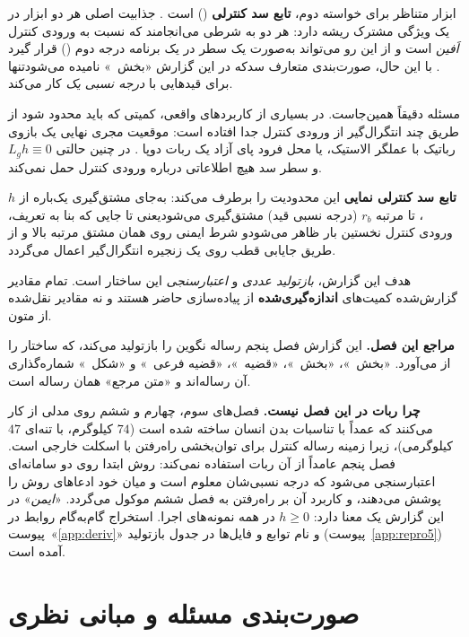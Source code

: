 \documentclass[10pt,twocolumn]{article}
\newcommand{\en}[1]{\lr{#1}}
\newcommand{\md}{\lr{\textemdash}}
\begin{document}
ابزار متناظر برای خواسته دوم، \textbf{تابع سد کنترلی} (\en{CBF}) است
\cite{ames2014acc,ames2017cbfqp}. جذابیت اصلی هر دو ابزار در یک ویژگی مشترک
ریشه دارد: هر دو به شرطی می‌انجامند که نسبت به ورودی کنترل \emph{اَفین} است و
از این رو می‌تواند به‌صورت یک سطر در یک برنامه درجه دوم (\en{QP}) قرار گیرد
\cite{boyd2004convex}. با این حال، صورت‌بندی متعارف سد\md{}که در این گزارش
«بخش~\en{5.1}» نامیده می‌شود\md{}تنها برای قیدهایی با \emph{درجه نسبی یک} کار می‌کند.

مسئله دقیقاً همین‌جاست. در بسیاری از کاربردهای واقعی، کمیتی که باید محدود شود
از طریق چند انتگرال‌گیر از ورودی کنترل جدا افتاده است: موقعیت مجری نهایی یک
بازوی رباتیک با عملگر الاستیک، یا محل فرود پای آزاد یک ربات دوپا
\cite{nguyen2015footstep}. در چنین حالتی $L_g h \equiv 0$ و سطر سد هیچ اطلاعاتی
درباره ورودی کنترل حمل نمی‌کند.

\textbf{تابع سد کنترلی نمایی} \cite{nguyen2016ecbf} این محدودیت را برطرف
می‌کند: به‌جای مشتق‌گیری یک‌باره از $h$، تا مرتبه $r_b$ (درجه نسبی قید)
مشتق‌گیری می‌شود\md{}یعنی تا جایی که بنا به تعریف، ورودی کنترل نخستین بار ظاهر
می‌شود\md{}و شرط ایمنی روی همان مشتق مرتبه بالا و از طریق جایابی قطب روی یک زنجیره
انتگرال‌گیر اعمال می‌گردد.

هدف این گزارش، \emph{بازتولید عددی} و \emph{اعتبارسنجی} این ساختار است. تمام
مقادیر گزارش‌شده کمیت‌های \textbf{اندازه‌گیری‌شده} از پیاده‌سازی حاضر هستند و
نه مقادیر نقل‌شده از متون.

\textbf{مراجع این فصل.} این گزارش فصل پنجم رساله نگوین \cite{nguyen2017thesis} را بازتولید
می‌کند، که ساختار \en{ECBF} را از \cite{nguyen2016ecbf} می‌آورد. «بخش~\en{5.1}»،
«بخش~\en{5.2}»، «قضیه~\en{5.1}»، «قضیه فرعی~\en{5.2}» و «شکل~\en{5.3}» شماره‌گذاری آن
رساله‌اند و «متن مرجع» همان رساله است.

\textbf{چرا ربات در این فصل نیست.} فصل‌های سوم، چهارم و ششم روی مدلی از \en{RABBIT} کار
می‌کنند که عمداً با تناسبات بدن انسان ساخته شده است ($74$ کیلوگرم، با تنه‌ای $47$ کیلوگرمی)،
زیرا زمینه رساله کنترل برای توان‌بخشی راه‌رفتن با اسکلت خارجی است. فصل پنجم عامداً از آن
ربات استفاده نمی‌کند: روش ابتدا روی دو سامانه‌ای اعتبارسنجی می‌شود که درجه نسبی‌شان معلوم است
و میان خود ادعاهای روش را پوشش می‌دهند، و کاربرد آن بر راه‌رفتن به فصل ششم موکول می‌گردد.
«\emph{ایمن}» در این گزارش یک معنا دارد: $h\ge0$ در همه نمونه‌های اجرا. استخراج گام‌به‌گام
روابط در پیوست~«\ref{app:deriv}» و نام توابع و فایل‌ها در جدول بازتولید
(پیوست~\ref{app:repro5}) آمده است.

\section{صورت‌بندی مسئله و مبانی نظری}
\end{document}
